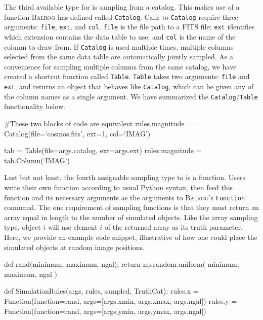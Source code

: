 \documentclass[11pt]{book}
\newcommand{\codett}[1]{\texttt{#1}}
\newcommand{\py}{Python}
\newcommand{\balrog}{\textsc{Balrog}}
\begin{document}
The third available type for \simrules{} is sampling from a catalog. 
This makes use of a function \balrog{} has defined called \codett{Catalog}. 
Calls to \codett{Catalog} require three arguments: \codett{file}, \codett{ext}, and \codett{col}.
\codett{file} is the file path to a FITS file;
\codett{ext} identifies which extension contains the data table to use; and
\codett{col} is the name of the column to draw from.
If \codett{Catalog} is used multiple times,
multiple columns selected from the same data table are automatically jointly sampled.
As a convenience for sampling multiple columns from the same catalog, 
we have created a shortcut function called \codett{Table}.
\codett{Table} takes two arguments: \codett{file} and \codett{ext},
and returns an object that behaves like \codett{Catalog},
which can be given any of the column names as a single argument.
We have summarized the \codett{Catalog}/\codett{Table} functionality below.

\begin{code}
#These two blocks of code are equivalent
rules.magnitude = Catalog(file=`cosmos.fits', ext=1, col=`IMAG')

tab = Table(file=args.catalog, ext=args.ext)
rules.magnitude = tab.Column(`IMAG')
\end{code}

Last but not least, the fourth assignable sampling type to \simrules{} is a function. 
Users write their own function according to usual \py{} syntax,
then feed this function and its necessary arguments as the arguments to
\balrog{}'s \codett{Function} command. 
The one requirement of sampling functions is that they must return an array equal in 
length to the number of simulated objects.
Like the array sampling type, object $i$ will use element $i$ of the returned array as its truth parameter.
Here, we provide an example code snippet, illustrative of how one could place the simulated objects at random image positions. 

\begin{code}
def rand(minimum, maximum, ngal):
    return np.random.uniform( minimum, maximum, ngal )

def SimulationRules(args, rules, sampled, TruthCat):
    rules.x = Function(function=rand, args=[args.xmin, args.xmax, args.ngal])
    rules.y = Function(function=rand, args=[args.ymin, args.ymax, args.ngal])
\end{code}
\end{document}
